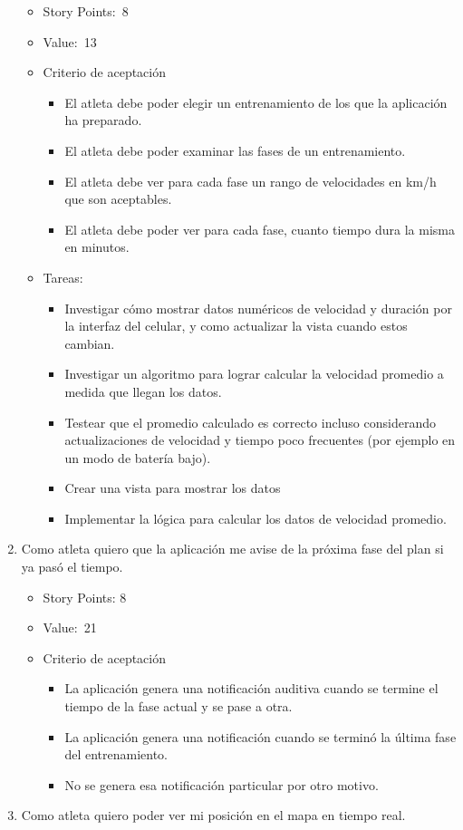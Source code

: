\begin{enumerate}
  \begin{itemize}
  \item
    Story Points:~8
  \item
    Value:~13
  \item
    Criterio de aceptación

    \begin{itemize}
    \item
      El atleta debe poder elegir un entrenamiento de los que la
      aplicación ha preparado.
    \item
      El atleta debe poder examinar las fases de un entrenamiento.
    \item
      El atleta debe ver para cada fase un rango de velocidades en km/h
      que son aceptables.
    \item
      El atleta debe poder ver para cada fase, cuanto tiempo dura la
      misma en minutos.
    \end{itemize}
  \item
    Tareas:

    \begin{itemize}
    \item
      Investigar cómo mostrar datos numéricos de velocidad y duración
      por la interfaz del celular, y como actualizar la vista cuando
      estos cambian.
    \item
      Investigar un algoritmo para lograr calcular la velocidad promedio
      a medida que llegan los datos.
    \item
      Testear que el promedio calculado es correcto incluso considerando
      actualizaciones de velocidad y tiempo poco frecuentes (por ejemplo
      en un modo de batería bajo).
    \item
      Crear una vista para mostrar los datos
    \item
      Implementar la lógica para calcular los datos de velocidad
      promedio.
    \end{itemize}
  \end{itemize}
\item
  Como atleta quiero que la aplicación me avise de la próxima fase del
  plan si ya pasó el tiempo.

  \begin{itemize}
  \item
    Story Points: 8
  \item
    Value:~21
  \item
    Criterio de aceptación

    \begin{itemize}
    \item
      La aplicación genera una notificación auditiva cuando se termine
      el tiempo de la fase actual y se pase a otra.
    \item
      La aplicación genera una notificación cuando se terminó la última
      fase del entrenamiento.
    \item
      No se genera esa notificación particular por otro motivo.
    \end{itemize}
  \end{itemize}
\item
  Como atleta quiero poder ver mi posición en el mapa en tiempo real.


\end{enumerate}
